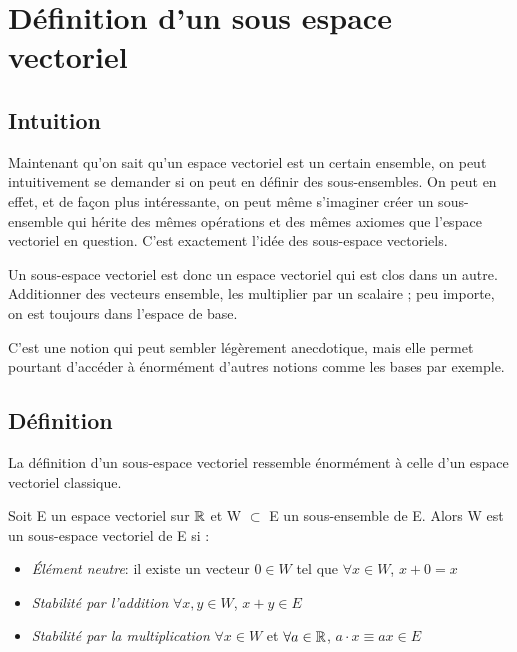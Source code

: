 \section{Définition d’un sous espace vectoriel}

\subsection{Intuition}
Maintenant qu'on sait qu'un espace vectoriel est un certain ensemble, on peut intuitivement se demander si on peut en définir des sous-ensembles. On peut en effet, et de façon plus intéressante, on peut même s'imaginer créer un sous-ensemble qui hérite des mêmes opérations et des mêmes axiomes que l'espace  vectoriel en question. C'est exactement l'idée des sous-espace vectoriels.

Un sous-espace vectoriel est donc un espace vectoriel qui est clos dans un autre. Additionner des vecteurs ensemble, les multiplier par un scalaire ; peu importe, on est toujours dans l'espace de base.

C'est une notion qui peut sembler légèrement anecdotique, mais elle permet pourtant d'accéder à énormément d'autres notions comme les bases par exemple.


\subsection{Définition}
La définition d'un sous-espace vectoriel ressemble énormément à celle d'un espace vectoriel classique. 
\begin{boxdef}
 Soit E un espace vectoriel sur $\mathbb{R}$ et W $\subset $ E un sous-ensemble de E. Alors W est un sous-espace vectoriel de E si :
 \begin{itemize}
     \item \textit{Élément neutre}: il existe un vecteur $0 \in W$ tel que $\forall x \in W$, $x+0 = x$ 
     \item \textit{Stabilité par l'addition} $\forall x,y \in W$, $x+y \in E$ 
     \item \textit{Stabilité par la multiplication} $\forall x \in W$ et $\forall a \in \mathbb{R}$, $a\cdot x \equiv ax \in E$
 \end{itemize}
\end{boxdef}

